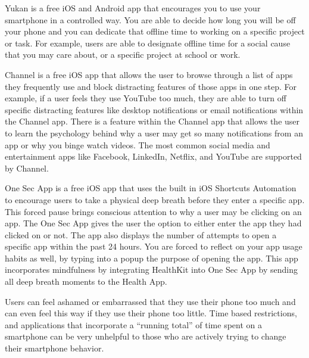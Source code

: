 \documentclass[12pt, title page, manuscript, nonacm]{acmart}
\begin{document}
\par
Yukan\cite{yukan} is a free iOS and Android app that encourages you to use your smartphone in a controlled way. You are able to decide how long you will be off your phone and you can dedicate that offline time to working on a specific project or task. For example, users are able to designate offline time for a social cause that you may care about, or a specific project at school or work.
\par 
Channel\cite{channel} is a free iOS app that allows the user to browse through a list of apps they frequently use and block distracting features of those apps in one step. For example, if a user feels they use YouTube too much, they are able to turn off specific distracting features like desktop notifications or email notifications within the Channel app. There is a feature within the Channel app that allows the user to learn the psychology behind why a user may get so many notifications from an app or why you binge watch videos. The most common social media and entertainment apps like Facebook, LinkedIn, Netflix, and YouTube are supported by Channel.
\par
One Sec App\cite{oneSec} is a free iOS app that uses the built in iOS Shortcuts Automation to encourage users to take a physical deep breath before they enter a specific app. This forced pause brings conscious attention to why a user may be clicking on an app. The One Sec App gives the user the option to either enter the app they had clicked on or not. The app also displays the number of attempts to open a specific app within the past 24 hours. You are forced to reflect on your app usage habits as well, by typing into a popup the purpose of opening the app. This app incorporates mindfulness by integrating HealthKit into One Sec App by sending all deep breath moments to the Health App.
\par
Users can feel ashamed or embarrassed that they use their phone too much and can even feel this way if they use their phone too little\cite{elhai2017non}. Time based restrictions\cite{kim2019lockntype}, and applications that incorporate a “running total” of time spent on a smartphone can be very unhelpful to those who are actively trying to change their smartphone behavior. 
\end{document}
